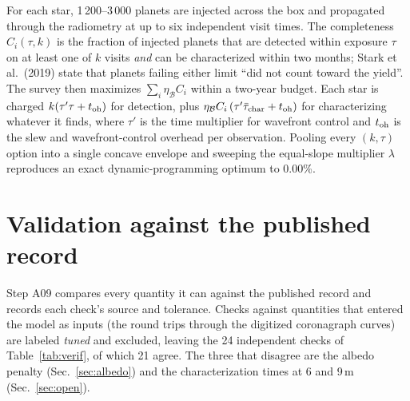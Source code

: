 \documentclass[11pt,a4paper]{article}
\begin{document}
For each star, 1\,200--3\,000 planets are injected across the box and propagated through the
radiometry at up to six independent visit times. The completeness $C_i(\tau, k)$ is the fraction
of injected planets that are detected within exposure $\tau$ on at least one of $k$ visits
\emph{and} can be characterized within two months; Stark et al.\ (2019) state that planets failing
either limit ``did not count toward the yield''. The survey then maximizes
$\sum_i \eta_\mathcal{B} C_i$ within a two-year budget. Each star is charged
$k(\tau'\tau + t_{\rm oh})$ for detection, plus
$\eta_\mathcal{B} C_i\,(\tau'\bar{\tau}_{\rm char} + t_{\rm oh})$ for characterizing whatever it
finds, where $\tau'$ is the time multiplier for wavefront control and $t_{\rm oh}$ is the slew and
wavefront-control overhead per observation. Pooling every $(k, \tau)$ option into a single concave
envelope and sweeping the equal-slope multiplier $\lambda$ reproduces an exact
dynamic-programming optimum to 0.00\%.

\section{Validation against the published record}
\label{sec:validation}

Step A09 compares every quantity it can against the published record and records each check's
source and tolerance. Checks against quantities that entered the model as inputs (the round trips
through the digitized coronagraph curves) are labeled \emph{tuned} and excluded, leaving the
24 independent checks of Table~\ref{tab:verif}, of which 21 agree. The three that
disagree are the albedo penalty (Sec.~\ref{sec:albedo}) and the characterization times at 6 and
9\,m (Sec.~\ref{sec:open}).
\end{document}
